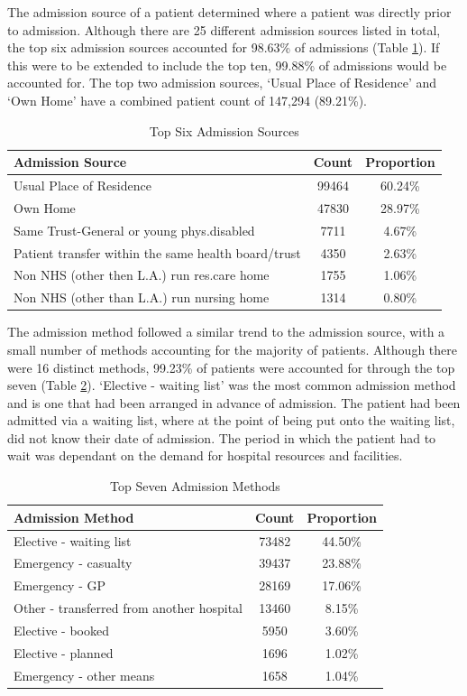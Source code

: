 \documentclass[../thesis.tex]{subfiles}
\begin{document}
The admission source of a patient determined where a patient was directly prior to admission. Although there are 25 different admission sources listed in total, the top six admission sources accounted for 98.63\% of admissions (Table \ref{tab:AdmissionSource}). If this were to be extended to include the top ten, 99.88\% of admissions would be accounted for. The top two admission sources, `Usual Place of Residence' and `Own Home' have a combined patient count of 147,294 (89.21\%).

\begin{table}[h!]
    \centering
    \begin{tabular}{lcc}\toprule
    \textbf{Admission Source} & \textbf{Count} &\textbf{Proportion} \\ \midrule
    Usual Place of Residence &	99464 & 60.24\% \\
Own Home&	47830 & 28.97\%\\
Same Trust-General or young phys.disabled&	7711 &4.67\%\\
Patient transfer within the same health board/trust	&4350 &2.63\%\\
Non NHS (other then L.A.) run res.care home&	1755 &1.06\%\\
Non NHS (other than L.A.) run nursing home&	1314 &0.80\%\\
 \bottomrule
    \end{tabular}
    \caption{Top Six Admission Sources}
    \label{tab:AdmissionSource}
\end{table}


The admission method followed a similar trend to the admission source, with a small number of methods accounting for the majority of patients. Although there were 16 distinct methods, 99.23\% of patients were accounted for through the top seven (Table \ref{tab:AdmissionMethod}). `Elective - waiting list' was the most common admission method and is one that had been arranged in advance of admission. The patient had been admitted via a waiting list, where at the point of being put onto the waiting list, did not know their date of admission. The period in which the patient had to wait was dependant on the demand for hospital resources and facilities.

\begin{table}[h!]
    \centering
    \begin{tabular}{lcc}\toprule
    \textbf{Admission Method} & \textbf{Count} &\textbf{Proportion} \\ \midrule
Elective - waiting list& 73482 & 44.50\%\\
Emergency - casualty&	39437 &23.88\%\\
Emergency - GP&  	28169&17.06\%\\
Other - transferred from another hospital  & 	13460&8.15\%\\
Elective - booked  &5950 & 3.60\%\\
Elective - planned&1696 & 1.02\%\\
Emergency - other means&1658 & 1.04\%\\
 \bottomrule
    \end{tabular}
    \caption{Top Seven Admission Methods}
    \label{tab:AdmissionMethod}
\end{table}
\end{document}
